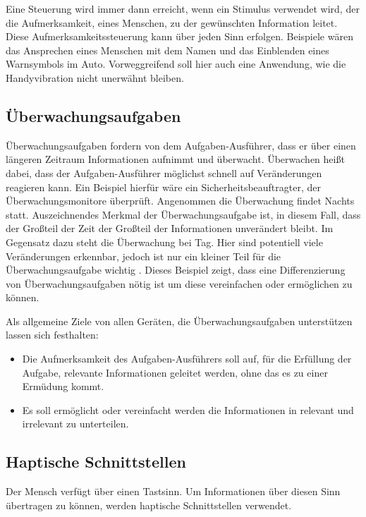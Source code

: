 \documentclass{llncs}					%
\begin{document}
Eine Steuerung wird immer dann erreicht, wenn ein Stimulus verwendet wird, der die Aufmerksamkeit, eines Menschen, zu der gewünschten Information leitet. Diese Aufmerksamkeitssteuerung kann über jeden Sinn erfolgen. Beispiele wären das Ansprechen eines Menschen mit dem Namen und das Einblenden eines Warnsymbols im Auto. Vorweggreifend soll hier auch eine Anwendung, wie die Handyvibration nicht unerwähnt bleiben.

\subsection{Überwachungsaufgaben}
Überwachungsaufgaben fordern von dem Aufgaben-Ausführer, dass er über einen längeren Zeitraum Informationen aufnimmt und überwacht. Überwachen heißt dabei, dass der Aufgaben-Ausführer möglichst schnell auf Veränderungen reagieren kann. Ein Beispiel hierfür wäre ein Sicherheitsbeauftragter, der Überwachungsmonitore überprüft. Angenommen die Überwachung findet Nachts statt. Auszeichnendes Merkmal der Überwachungsaufgabe ist, in diesem Fall, dass der Großteil der Zeit der Großteil der Informationen unverändert bleibt.
Im Gegensatz dazu steht die Überwachung bei Tag. Hier sind potentiell viele Veränderungen erkennbar, jedoch ist nur ein kleiner Teil für die Überwachungsaufgabe wichtig \cite{doi:10.1177/001872087902100109}.
Dieses Beispiel zeigt, dass eine Differenzierung von Überwachungsaufgaben nötig ist um diese vereinfachen oder ermöglichen zu können.

Als allgemeine Ziele von allen Geräten, die Überwachungsaufgaben unterstützen lassen sich festhalten:
\begin{itemize}
	\item Die Aufmerksamkeit  des Aufgaben-Ausführers soll auf, für die Erfüllung der Aufgabe, relevante Informationen geleitet werden, ohne das es zu einer Ermüdung kommt.
	\item Es soll ermöglicht oder vereinfacht werden die Informationen in relevant und irrelevant zu unterteilen.
\end{itemize}

\subsection{Haptische Schnittstellen}
Der Mensch verfügt über einen Tastsinn. Um Informationen über diesen Sinn übertragen zu können, werden haptische Schnittstellen verwendet. 

 
\end{document}
